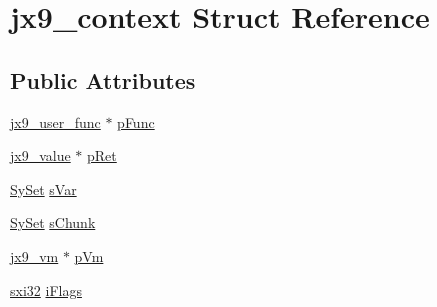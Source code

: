 \hypertarget{structjx9__context}{\section{jx9\-\_\-context Struct Reference}
\label{d7/db7/structjx9__context}
}
\subsection*{Public Attributes}
\begin{DoxyCompactItemize}
\item 
\hyperlink{structjx9__user__func}{jx9\-\_\-user\-\_\-func} $\ast$ \hyperlink{structjx9__context_ae41bd1f00ddcbc91e5bb3208600fad90}{p\-Func}
\item 
\hyperlink{structjx9__value}{jx9\-\_\-value} $\ast$ \hyperlink{structjx9__context_a12a573fcc844cc18c3593f03e7f4a906}{p\-Ret}
\item 
\hyperlink{struct_sy_set}{Sy\-Set} \hyperlink{structjx9__context_a030feb1095c8edbcc2d07b025a3f4d71}{s\-Var}
\item 
\hyperlink{struct_sy_set}{Sy\-Set} \hyperlink{structjx9__context_a797c12d739e447c76d853bbb509e2e1e}{s\-Chunk}
\item 
\hyperlink{structjx9__vm}{jx9\-\_\-vm} $\ast$ \hyperlink{structjx9__context_a40c5d65709457fd6d770ef16f31acfd9}{p\-Vm}
\item 
\hyperlink{unqlite_8c_a5a58035d4ae379178e2ca46cc3272fc5}{sxi32} \hyperlink{structjx9__context_a370cb1ecfc146a07df80ad2c307cc160}{i\-Flags}
\end{DoxyCompactItemize}


